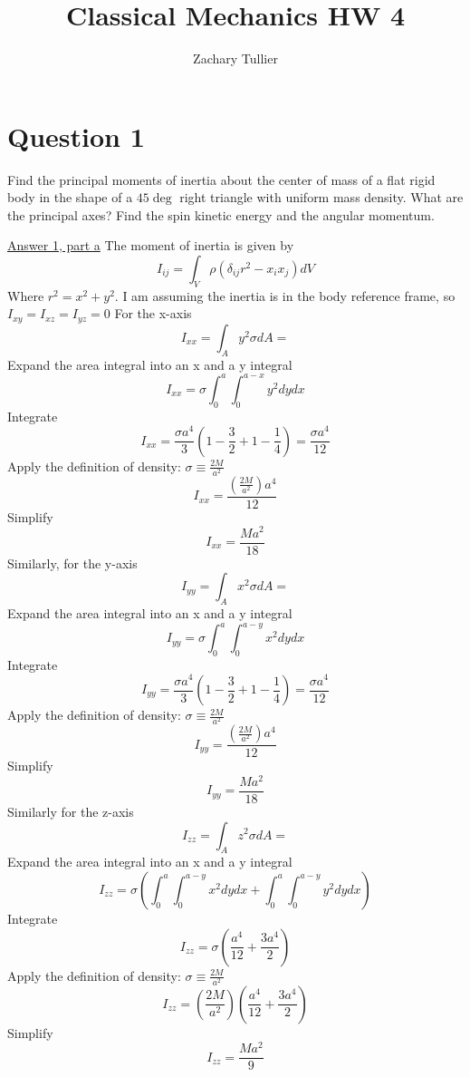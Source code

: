 \documentclass[12pt]{article}
\begin{document}
\singlespacing  %
\title{Classical Mechanics HW 4}

\author[1]{Zachary Tullier}

\maketitle

\section{Question 1}
    Find the principal moments of inertia about the center of mass of a flat rigid body in the shape of a $45\deg$ right triangle with uniform mass density. What are the principal axes? Find the spin kinetic energy and the angular momentum.

    \underline{Answer 1, part a}
    The moment of inertia is given by
    \[
        I_{ij} = \int_V \rho \left( \delta_{ij} r^2 - x_i x_j \right) dV
    \]
    Where $r^2 = x^2 + y^2$. I am assuming the inertia is in the body reference frame, so $I_{xy} = I_{xz} = I_{yz} = 0$
    \newline For the x-axis
    \[
        I_{xx} = \int_A y^2 \sigma dA =
    \]
    Expand the area integral into an x and a y integral
    \[
        I_{xx} = \sigma \int_0^a \int_0^{a-x} y^2 dy dx
    \]
    Integrate
    \[
        I_{xx} = \frac{\sigma a^4}{3} (1 - \frac{3}{2} + 1 - \frac{1}{4}) = \frac{\sigma a^4}{12}
    \]
    Apply the definition of density: $\sigma \equiv \frac{2 M}{a^2}$
    \[
        I_{xx} = \frac{\left(\frac{2 M}{a^2} \right) a^4}{12}
    \]
    Simplify
    \[
        I_{xx} = \frac{M a^2}{18}
    \]
    Similarly, for the y-axis
    \[
        I_{yy} = \int_A x^2 \sigma dA =
    \]
    Expand the area integral into an x and a y integral
    \[
        I_{yy} = \sigma \int_0^a \int_0^{a-y} x^2 dy dx
    \]
    Integrate
    \[
        I_{yy} = \frac{\sigma a^4}{3} (1 - \frac{3}{2} + 1 - \frac{1}{4}) = \frac{\sigma a^4}{12}
    \]
    Apply the definition of density: $\sigma \equiv \frac{2 M}{a^2}$
    \[
        I_{yy} = \frac{\left(\frac{2 M}{a^2} \right) a^4}{12}
    \]
    Simplify
    \[
        I_{yy} = \frac{M a^2}{18}
    \]
    Similarly for the z-axis
    \[
        I_{zz} = \int_A z^2 \sigma dA =
    \]
    Expand the area integral into an x and a y integral
    \[
        I_{zz} = \sigma \left( \int_0^a \int_0^{a-y} x^2 dy dx + \int_0^a \int_0^{a-y} y^2 dy dx \right)
    \]
    Integrate
    \[
        I_{zz} = \sigma \left(\frac{a^4}{12} + \frac{3 a^4}{2} \right)
    \]
    Apply the definition of density: $\sigma \equiv \frac{2 M}{a^2}$
    \[
        I_{zz} = \left(\frac{2 M}{a^2} \right) \left(\frac{a^4}{12} + \frac{3 a^4}{2} \right)
    \]
    Simplify
    \[
        I_{zz} = \frac{M a^2}{9}
    \]
\end{document}

